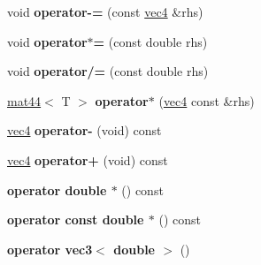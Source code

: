 \begin{DoxyCompactItemize}
\item 
\hypertarget{classmath_1_1vec4_a13e0880525d0078e945e5f35c2b276c0}{
void {\bfseries operator-\/=} (const \hyperlink{classmath_1_1vec4}{vec4} \&rhs)}
\label{classmath_1_1vec4_a13e0880525d0078e945e5f35c2b276c0}

\item 
\hypertarget{classmath_1_1vec4_a1433627c43ae4b6ac09967a81ba503fc}{
void {\bfseries operator$\ast$=} (const double rhs)}
\label{classmath_1_1vec4_a1433627c43ae4b6ac09967a81ba503fc}

\item 
\hypertarget{classmath_1_1vec4_a94959433a5f20154be3dfc9fc2cfd98b}{
void {\bfseries operator/=} (const double rhs)}
\label{classmath_1_1vec4_a94959433a5f20154be3dfc9fc2cfd98b}

\item 
\hypertarget{classmath_1_1vec4_ac9d0303327a82d0e7f3ad27398332775}{
\hyperlink{classmath_1_1mat44}{mat44}$<$ T $>$ {\bfseries operator$\ast$} (\hyperlink{classmath_1_1vec4}{vec4} const \&rhs)}
\label{classmath_1_1vec4_ac9d0303327a82d0e7f3ad27398332775}

\item 
\hypertarget{classmath_1_1vec4_aeba6bad8bd67056974c9c1f59632e66d}{
\hyperlink{classmath_1_1vec4}{vec4} {\bfseries operator-\/} (void) const }
\label{classmath_1_1vec4_aeba6bad8bd67056974c9c1f59632e66d}

\item 
\hypertarget{classmath_1_1vec4_a5dab34b7d5d9bfe0129a68b9defede2b}{
\hyperlink{classmath_1_1vec4}{vec4} {\bfseries operator+} (void) const }
\label{classmath_1_1vec4_a5dab34b7d5d9bfe0129a68b9defede2b}

\item 
\hypertarget{classmath_1_1vec4_a7f98699135a12f541d012253ff150972}{
{\bfseries operator double $\ast$} () const }
\label{classmath_1_1vec4_a7f98699135a12f541d012253ff150972}

\item 
\hypertarget{classmath_1_1vec4_aaceabf0de51b5fe3f89029b7dd6f5c0d}{
{\bfseries operator const double $\ast$} () const }
\label{classmath_1_1vec4_aaceabf0de51b5fe3f89029b7dd6f5c0d}

\item 
\hypertarget{classmath_1_1vec4_af060e710dbc22c9c4f561e063a61d164}{
{\bfseries operator vec3$<$ double $>$} ()}
\label{classmath_1_1vec4_af060e710dbc22c9c4f561e063a61d164}

\end{DoxyCompactItemize}
